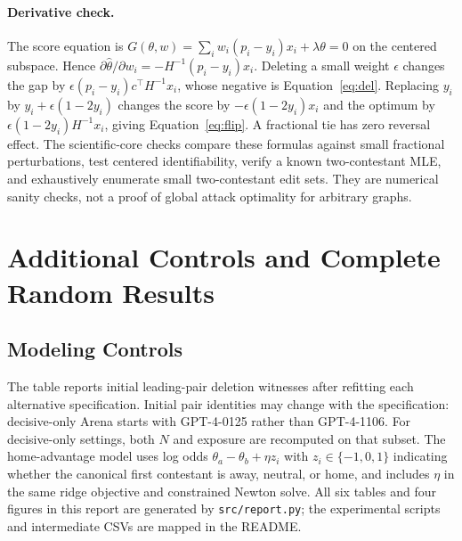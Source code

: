 \documentclass{article}
\newcommand{\NF}{\textsc{nf}}
\begin{document}
\paragraph{Derivative check.}
The score equation is $G(\theta,w)=\sum_iw_i(p_i-y_i)x_i+\lambda\theta=0$ on the centered subspace. Hence $\partial\widehat\theta/\partial w_i=-H^{-1}(p_i-y_i)x_i$. Deleting a small weight $\epsilon$ changes the gap by $\epsilon(p_i-y_i)c^\top H^{-1}x_i$, whose negative is Equation~\eqref{eq:del}. Replacing $y_i$ by $y_i+\epsilon(1-2y_i)$ changes the score by $-\epsilon(1-2y_i)x_i$ and the optimum by $\epsilon(1-2y_i)H^{-1}x_i$, giving Equation~\eqref{eq:flip}. A fractional tie has zero reversal effect. The scientific-core checks compare these formulas against small fractional perturbations, test centered identifiability, verify a known two-contestant MLE, and exhaustively enumerate small two-contestant edit sets. They are numerical sanity checks, not a proof of global attack optimality for arbitrary graphs.

\section{Additional Controls and Complete Random Results}\label{app:controls}
\subsection{Modeling Controls}
\begin{table}[ht]
\caption{Initial leading-pair deletion witnesses under alternative modeling choices. \NF{} retains the primary meaning: no witness found within 5\% of that specification's archive.}
\label{tab:ablations}
\centering\small
\end{table}
The table reports initial leading-pair deletion witnesses after refitting each alternative specification. Initial pair identities may change with the specification: decisive-only Arena starts with GPT-4-0125 rather than GPT-4-1106. For decisive-only settings, both $N$ and exposure are recomputed on that subset. The home-advantage model uses log odds $\theta_a-\theta_b+\eta z_i$ with $z_i\in\{-1,0,1\}$ indicating whether the canonical first contestant is away, neutral, or home, and includes $\eta$ in the same ridge objective and constrained Newton solve. All six tables and four figures in this report are generated by \texttt{src/report.py}; the experimental scripts and intermediate CSVs are mapped in the README.
\end{document}
